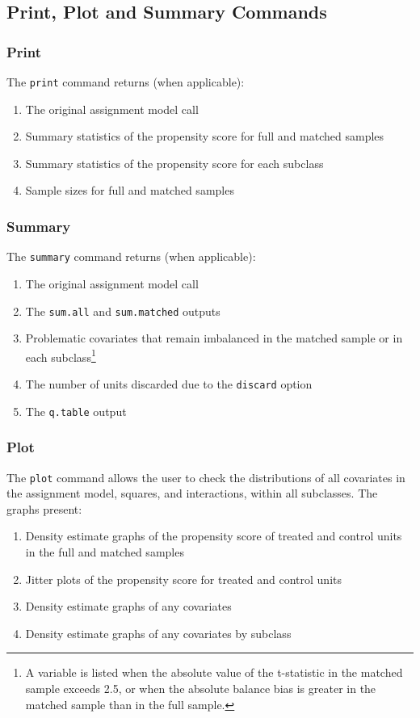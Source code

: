 \documentclass[oneside,letterpaper,titlepage]{article}
\begin{document}
\subsection{Print, Plot and Summary Commands}
\subsubsection{Print}
The \texttt{print} command returns (when applicable):
\begin{enumerate}
\item The original assignment model call 
\item Summary statistics of the propensity score for full and matched
  samples
\item Summary statistics of the propensity score for each subclass
\item Sample sizes for full and matched samples
\end{enumerate}

\subsubsection{Summary}
The \texttt{summary} command returns (when applicable):
\begin{enumerate}
\item The original assignment model call 
\item The \texttt{sum.all} and \texttt{sum.matched} outputs 
\item Problematic covariates that remain imbalanced in the matched
    sample or in each subclass\footnote{A
    variable is listed when the absolute value of the t-statistic in
    the matched sample exceeds 2.5, or when the absolute balance bias is
    greater in the matched sample than in the full sample.}
\item The number of units discarded due to the \texttt{discard} option
\item The \texttt{q.table} output
\end{enumerate}

\subsubsection{Plot}
The \texttt{plot} command allows the user to check the
 distributions of all covariates in the assignment model, squares,
 and interactions, within all subclasses.  The graphs present:
\begin{enumerate}
\item Density estimate graphs of the propensity score of treated and control
  units in the full and matched samples 
\item Jitter plots of the propensity score for treated and control
  units 
\item Density estimate graphs of any covariates 
\item Density estimate graphs of any covariates by subclass
\end{enumerate}
\end{document}
